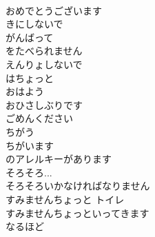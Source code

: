 \documentclass[8pt]{extreport}
\begin{document}
\begin{CJK}{UTF8}{min}
\\	おめでとうございます	
\\	きにしないで	
\\	がんばって	
\\	をたべられません	
\\	えんりょしないで	
\\	はちょっと	
\\	おはよう	
\\	おひさしぶりです	
\\	ごめんください	
\\	ちがう	
\\	ちがいます	
\\	のアレルキーがあります	
\\	そろそろ...	
\\	そろそろいかなければなりません	
\\	すみませんちょっと トイレ	
\\	すみませんちょっといってきます	
\\	なるほど	
\end{CJK}
\end{document}
